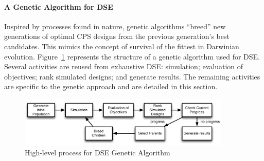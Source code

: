 \paragraph{A Genetic Algorithm for DSE}
Inspired by processes found in nature, genetic algorithms ``breed'' new generations of optimal CPS designs from the previous generation's best candidates. This mimics the concept of survival of the fittest in Darwinian evolution.
Figure~\ref{fig:ga_dse_process} represents the structure of a genetic algorithm used for DSE.  Several activities are reused from exhaustive DSE: simulation; evaluation of objectives; rank simulated designs; and generate results. The remaining activities are specific to the genetic approach and are detailed in this section.

\begin{figure}[h!]
	\centering
	\includegraphics[width=0.9\textwidth]{figures/ga_process}
	\caption{High-level process for DSE Genetic Algorithm}
	\label{fig:ga_dse_process}
\end{figure}

